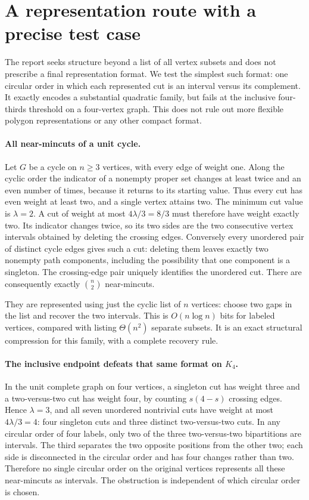 \documentclass[11pt]{article}
\begin{document}
\section{A representation route with a precise test case}
The report seeks structure beyond a list of all vertex subsets and
does not prescribe a final representation format. We test the simplest
such format: one circular order in which each represented cut is
an interval versus its complement. It exactly encodes a substantial
quadratic family, but fails at the inclusive four-thirds threshold
on a four-vertex graph. This does not rule out more flexible polygon
representations or any other compact format.

\paragraph{All near-mincuts of a unit cycle.}
Let $G$ be a cycle on $n\ge3$ vertices, with every edge
of weight one. Along the cyclic order the indicator of a nonempty
proper set changes at least twice and an even number of times,
because it returns to its starting value. Thus every cut has
even weight at least two, and a single vertex attains two.
The minimum cut value is $\lambda=2$. A cut of weight at
most $4\lambda/3=8/3$ must therefore have weight exactly two.
Its indicator changes twice, so its two sides are the two
consecutive vertex intervals obtained by deleting the crossing edges.
Conversely every unordered pair of distinct cycle edges gives such
a cut: deleting them leaves exactly two nonempty path components,
including the possibility that one component is a singleton.
The crossing-edge pair uniquely identifies the unordered cut.
There are consequently exactly $\binom n2$ near-mincuts.

They are represented using just the cyclic list of $n$ vertices:
choose two gaps in the list and recover the two intervals.
This is $O(n\log n)$ bits for labeled vertices, compared with
listing $\Theta(n^2)$ separate subsets. It is an exact structural
compression for this family, with a complete recovery rule.

\paragraph{The inclusive endpoint defeats that same format on $K_4$.}
In the unit complete graph on four vertices, a singleton cut has
weight three and a two-versus-two cut has weight four, by counting
$s(4-s)$ crossing edges. Hence $\lambda=3$, and all seven
unordered nontrivial cuts have weight at most $4\lambda/3=4$:
four singleton cuts and three distinct two-versus-two cuts.
In any circular order of four labels, only two of the three
two-versus-two bipartitions are intervals. The third separates the
two opposite positions from the other two; each side is disconnected
in the circular order and has four changes rather than two.
Therefore no single circular order on the original vertices
represents all these near-mincuts as intervals. The obstruction is
independent of which circular order is chosen.
\end{document}
